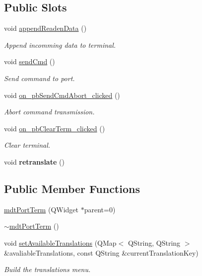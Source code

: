 \subsection*{Public Slots}
\begin{DoxyCompactItemize}
\item 
void \hyperlink{classmdt_port_term_a5bd2b5e6c19c2c4b612f84763bb9ed6f}{appendReadenData} ()
\begin{DoxyCompactList}\small\item\em Append incomming data to terminal. \end{DoxyCompactList}\item 
void \hyperlink{classmdt_port_term_a7ec568c44f862fe7aee83f1a271ac6bb}{sendCmd} ()
\begin{DoxyCompactList}\small\item\em Send command to port. \end{DoxyCompactList}\item 
void \hyperlink{classmdt_port_term_a1b232e686b401d7103eb1c682be330a9}{on\_\-pbSendCmdAbort\_\-clicked} ()
\begin{DoxyCompactList}\small\item\em Abort command transmission. \end{DoxyCompactList}\item 
\hypertarget{classmdt_port_term_abb3fc55837782dbea240b069a48b18ce}{
void \hyperlink{classmdt_port_term_abb3fc55837782dbea240b069a48b18ce}{on\_\-pbClearTerm\_\-clicked} ()}
\label{classmdt_port_term_abb3fc55837782dbea240b069a48b18ce}

\begin{DoxyCompactList}\small\item\em Clear terminal. \end{DoxyCompactList}\item 
\hypertarget{classmdt_port_term_a542e20f789bcdc5f2ddf2b6e698ceea2}{
void {\bfseries retranslate} ()}
\label{classmdt_port_term_a542e20f789bcdc5f2ddf2b6e698ceea2}

\end{DoxyCompactItemize}
\subsection*{Public Member Functions}
\begin{DoxyCompactItemize}
\item 
\hyperlink{classmdt_port_term_a5e93890f53b5112be80983779a3ab233}{mdtPortTerm} (QWidget $\ast$parent=0)
\item 
\hyperlink{classmdt_port_term_a5576a15a2b6e39c149207ffdb7869ef7}{$\sim$mdtPortTerm} ()
\item 
\hypertarget{classmdt_port_term_a9e2987c96c85189ce118aab7af77fb71}{
void \hyperlink{classmdt_port_term_a9e2987c96c85189ce118aab7af77fb71}{setAvailableTranslations} (QMap$<$ QString, QString $>$ \&avaliableTranslations, const QString \&currentTranslationKey)}
\label{classmdt_port_term_a9e2987c96c85189ce118aab7af77fb71}

\begin{DoxyCompactList}\small\item\em Build the translations menu. \end{DoxyCompactList}\end{DoxyCompactItemize}


